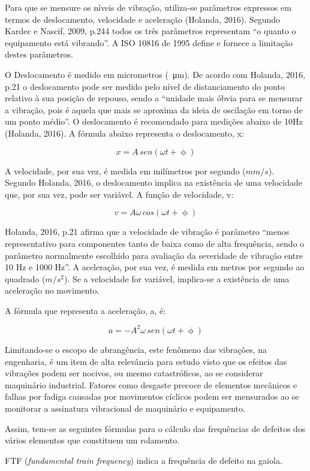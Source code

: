 \documentclass[
	12pt,				
	oneside,			
	a4paper,			
	english,			
	brazil				
	]{abntex2ppgsi}
\begin{document}
Para que se mensure os níveis de vibração, utiliza-se parâmetros expressos em termos de deslocamento, velocidade e aceleração (Holanda, 2016). Segundo Kardec e Nascif, 2009, p.244 todos os três parâmetros representam “o quanto o equipamento está vibrando”. A ISO 10816 de 1995 define e fornece a limitação destes parâmetros. 

O Deslocamento é medido em micrometros (\SI{}{\micro\metre}). De acordo com Holanda, 2016, p.21 o deslocamento pode ser medido pelo nível de distanciamento do ponto relativo à sua posição de repouso, sendo a “unidade mais óbvia para se mensurar a vibração, pois é aquela que mais se aproxima da ideia de oscilação em torno de um ponto médio”. O deslocamento é recomendado para medições abaixo de 10Hz (Holanda, 2016). A fórmula abaixo representa o deslocamento, x:

\[x = A \,sen (\omega t + \upphi)\]

A velocidade, por sua vez, é medida em milímetros por segundo ($mm/s$). Segundo Holanda, 2016, o deslocamento implica na existência de uma velocidade que, por sua vez, pode ser variável. A função de velocidade, v:

\[v = A\omega \,cos (\omega t + \upphi)\]

Holanda, 2016, p.21 afirma que a velocidade de vibração é parâmetro “menos representativo para componentes tanto de baixa como de alta frequência, sendo o parâmetro normalmente escolhido para avaliação da severidade de vibração entre 10 Hz e 1000 Hz”.
A aceleração, por sua vez, é medida em metros por segundo ao quadrado ($m/s^{2}$). Se a velocidade for variável, implica-se a existência de uma aceleração no movimento. 

A fórmula que representa a aceleração, a, é:

\[a = -A^{2} \omega \,sen (\omega t + \upphi)\]

Limitando-se o escopo de abrangência, este fenômeno das vibrações, na engenharia, é um item de alta relevância para estudo visto que os efeitos das vibrações podem ser nocivos, ou mesmo catastróficos, ao se considerar maquinário industrial. Fatores como desgaste precoce de elementos mecânicos e falhas por fadiga causadas por movimentos cíclicos podem ser mensurados ao se monitorar a assinatura vibracional de maquinário e equipamento. 

Assim, tem-se as seguintes fórmulas para o cálculo das frequências de defeitos dos vários  elementos que constituem um rolamento. 

FTF (\textit{fundamental train frequency}) indica a frequência de defeito na gaiola. 
\end{document}
